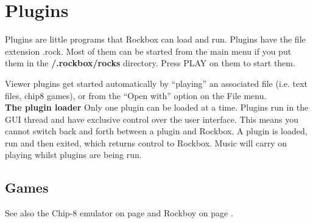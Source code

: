 \chapter{Plugins}\label{ref:plugins}
Plugins are little programs that Rockbox can load and run. Plugins have
the file extension .rock.  Most of them can be started from the main
menu if you put them in the \textbf{/.rockbox/rocks} directory. Press
PLAY on them to start them.

Viewer plugins get started automatically by
``playing'' an associated file (i.e. text
files, chip8 games), or from the ``Open with'' option on the File menu.\\

\textbf{The plugin loader}
Only one plugin can be loaded at a time. Plugins run in the GUI thread
and have exclusive control over the user interface. This means you
cannot switch back and forth between a plugin and Rockbox. A plugin is
loaded, run and then exited, which returns control to Rockbox.  Music
will carry on playing whilst plugins are being run.

\section{Games}
    {See also the Chip{}-8 emulator on page \pageref{ref:Chip8emulator}
    {and Rockboy on page \pageref{ref:Rockboy}}.}













